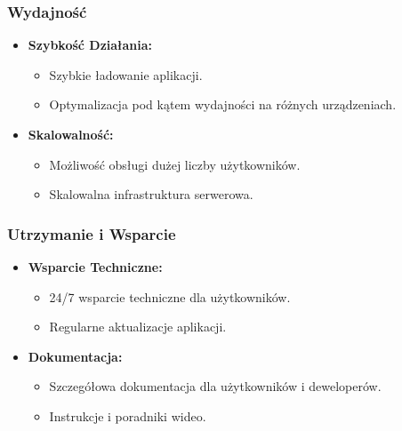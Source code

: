 \documentclass[a4paper,12pt]{article}
\begin{document}
    \subsubsection{Wydajność}
    \begin{itemize}
        \item \textbf{Szybkość Działania:}
        \begin{itemize}
            \item Szybkie ładowanie aplikacji.
            \item Optymalizacja pod kątem wydajności na różnych urządzeniach.
        \end{itemize}
        \item \textbf{Skalowalność:}
        \begin{itemize}
            \item Możliwość obsługi dużej liczby użytkowników.
            \item Skalowalna infrastruktura serwerowa.
        \end{itemize}
    \end{itemize}

    \subsubsection{Utrzymanie i Wsparcie}
    \begin{itemize}
        \item \textbf{Wsparcie Techniczne:}
        \begin{itemize}
            \item 24/7 wsparcie techniczne dla użytkowników.
            \item Regularne aktualizacje aplikacji.
        \end{itemize}
        \item \textbf{Dokumentacja:}
        \begin{itemize}
            \item Szczegółowa dokumentacja dla użytkowników i deweloperów.
            \item Instrukcje i poradniki wideo.
        \end{itemize}
    \end{itemize}
\end{document}
